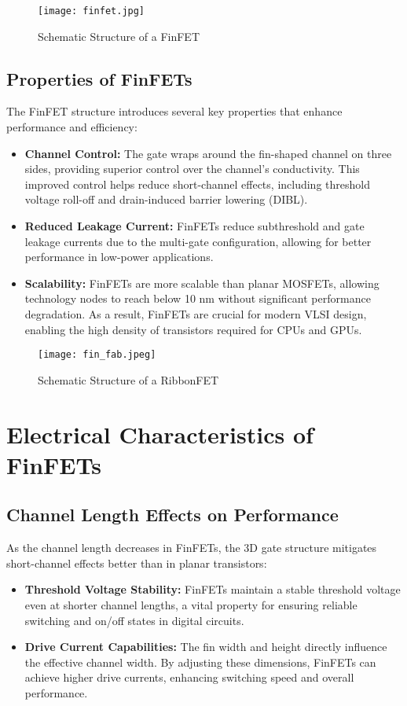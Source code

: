 \documentclass[12pt]{report}
\begin{document}
\begin{titlepage}
\begin{figure}[h]
    \centering
    \texttt{[image: finfet.jpg]} %
    \caption{Schematic Structure of a FinFET}
    \label{fig:finfet_structure}
\end{figure}

\subsection{Properties of FinFETs}
The FinFET structure introduces several key properties that enhance performance and efficiency:
\begin{itemize}
    \item \textbf{Channel Control:} The gate wraps around the fin-shaped channel on three sides, providing superior control over the channel's conductivity. This improved control helps reduce short-channel effects, including threshold voltage roll-off and drain-induced barrier lowering (DIBL).
    \item \textbf{Reduced Leakage Current:} FinFETs reduce subthreshold and gate leakage currents due to the multi-gate configuration, allowing for better performance in low-power applications.
    \item \textbf{Scalability:} FinFETs are more scalable than planar MOSFETs, allowing technology nodes to reach below 10 nm without significant performance degradation. As a result, FinFETs are crucial for modern VLSI design, enabling the high density of transistors required for CPUs and GPUs.
\end{itemize}

\begin{figure}[h]
    \centering
    \texttt{[image: fin\_fab.jpeg]} %
    \caption{Schematic Structure of a RibbonFET}
    \label{fig:ribbonfet_structure}
\end{figure}
\vspace{1in}

\section{Electrical Characteristics of FinFETs}
\subsection{Channel Length Effects on Performance}
As the channel length decreases in FinFETs, the 3D gate structure mitigates short-channel effects better than in planar transistors:
\begin{itemize}
    \item \textbf{Threshold Voltage Stability:} FinFETs maintain a stable threshold voltage even at shorter channel lengths, a vital property for ensuring reliable switching and on/off states in digital circuits.
    \item \textbf{Drive Current Capabilities:} The fin width and height directly influence the effective channel width. By adjusting these dimensions, FinFETs can achieve higher drive currents, enhancing switching speed and overall performance.
\end{itemize}


\end{titlepage}
\end{document}
